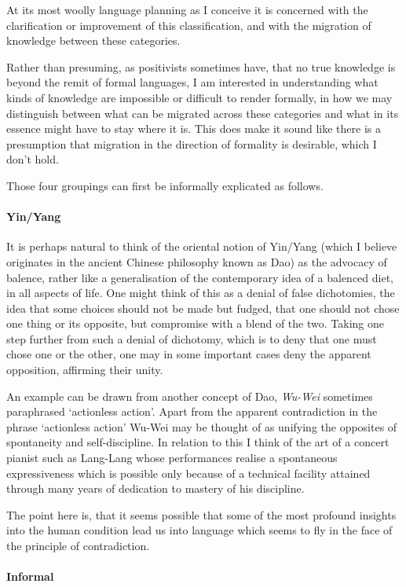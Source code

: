\documentclass[numreferences]{rbjk}
\begin{document}
\begin{article}
At its most woolly language planning as I conceive it is concerned with the clarification or improvement of this classification, and with the migration of knowledge between these categories.

Rather than presuming, as positivists sometimes have, that no true knowledge is beyond the remit of formal languages, I am interested in understanding what kinds of knowledge are impossible or difficult to render formally, in how we may distinguish between what can be migrated across these categories and what in its essence might have to stay where it is.
This does make it sound like there is a presumption that migration in the direction of formality is desirable, which I don't hold.

Those four groupings can first be informally explicated as follows.

\paragraph{Yin/Yang}
It is perhaps natural to think of the oriental notion of Yin/Yang (which I believe originates in the ancient Chinese philosophy known as Dao) as the advocacy of balence, rather like a generalisation of the contemporary idea of a balenced diet, in all aspects of life.
One might think of this as a denial of false dichotomies, the idea that some choices should not be made but fudged, that one should not chose one thing or its opposite, but compromise with a blend of the two.
Taking one step further from such a denial of dichotomy, which is to deny that one must chose one or the other, one may in some important cases deny the apparent opposition, affirming their unity.

An example can be drawn from another concept of Dao, \emph{Wu-Wei} sometimes paraphrased `actionless action'.
Apart from the apparent contradiction in the phrase `actionless action' Wu-Wei may be thought of as unifying the opposites of spontaneity and self-discipline.
In relation to this I think of the art of a concert pianist such as Lang-Lang whose performances realise a spontaneous expressiveness which is possible only because of a technical facility attained through many years of dedication to mastery of his discipline.

The point here is, that it seems possible that some of the most profound insights into the human condition lead us into language which seems to fly in the face of the principle of contradiction.

\paragraph{Informal}


\end{article}
\end{document}

